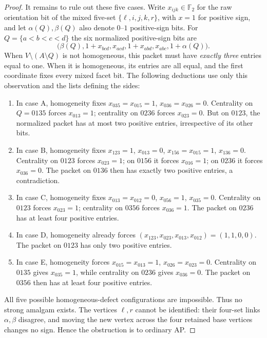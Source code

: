 \documentclass[11pt,a4paper]{article}
\theoremstyle{remark}
\newcommand{\F}{\mathbb F_2}
\begin{document}
\begin{proof}
It remains to rule out these five cases.  Write
$x_{ijk}\in\F$ for the raw orientation bit of the mixed five-set
$\{\ell,i,j,k,r\}$, with $x=1$ for positive sign, and let
$\alpha(Q),\beta(Q)$ also denote $0$--$1$ positive-sign bits.
For $Q=\{a<b<c<d\}$ the six normalized positive-sign bits are
\begin{equation}\label{eq:mixed5packet}
 \bigl(\beta(Q),1+x_{bcd},x_{acd},1+x_{abd},x_{abc},1+\alpha(Q)\bigr).
\end{equation}
When $V\setminus(A\setminus Q)$ is not homogeneous, this packet must
have \emph{exactly three} entries equal to one.  When it is
homogeneous, its entries are all equal, and the first coordinate
fixes every mixed facet bit.  The following deductions use only this
observation and the lists defining the sides:
\begin{enumerate}[label=\textup{(\Alph*)},leftmargin=15mm]
\item In case A, homogeneity fixes
$x_{035}=x_{015}=1$, $x_{036}=x_{026}=0$.
Centrality on $Q=0135$ forces $x_{013}=1$; centrality on $0236$
forces $x_{023}=0$.  But on $0123$, the normalized packet has
at most two positive entries, irrespective of its other bits.
\item In case B, homogeneity fixes
$x_{123}=1$, $x_{013}=0$, $x_{156}=x_{015}=1$, $x_{136}=0$.
Centrality on $0123$ forces $x_{023}=1$;
on $0156$ it forces $x_{016}=1$;
on $0236$ it forces $x_{036}=0$.
The packet on $0136$ then has exactly two positive entries,
a contradiction.
\item In case C, homogeneity fixes
$x_{013}=x_{012}=0$, $x_{056}=1$, $x_{035}=0$.
Centrality on $0123$ forces $x_{023}=1$; centrality on $0356$
forces $x_{036}=1$.  The packet on $0236$ has at least four
positive entries.
\item In case D, homogeneity already forces
$(x_{123},x_{023},x_{013},x_{012})=(1,1,0,0)$.
The packet on $0123$ has only two positive entries.
\item In case E, homogeneity forces
$x_{015}=x_{013}=1$, $x_{026}=x_{023}=0$.
Centrality on $0135$ gives $x_{035}=1$, while centrality on $0236$
gives $x_{036}=0$.  The packet on $0356$ then has at least four
positive entries.
\end{enumerate}
All five possible homogeneous-defect configurations are impossible.
Thus no strong amalgam exists.  The vertices $\ell,r$ cannot be
identified: their four-set links $\alpha,\beta$ disagree, and
moving the new vertex across the four retained base vertices
changes no sign.  Hence the obstruction is to ordinary AP.
\end{proof}
\end{document}
